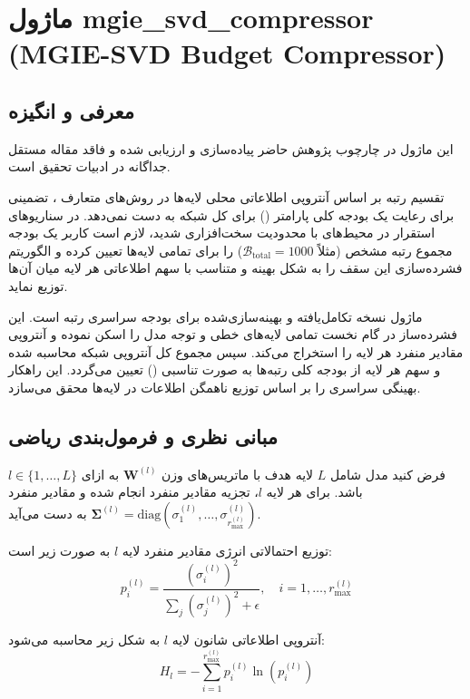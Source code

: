 \section{ماژول mgie\_svd\_compressor (MGIE-SVD Budget Compressor)}
\label{sec:module_mgie_svd_compressor}

\subsection{معرفی و انگیزه}
این ماژول در چارچوب پژوهش حاضر پیاده‌سازی و ارزیابی شده و فاقد مقاله مستقل جداگانه در ادبیات تحقیق است.

تقسیم رتبه بر اساس آنتروپی اطلاعاتی محلی لایه‌ها در روش‌های متعارف ، تضمینی برای رعایت یک بودجه کلی پارامتر () برای کل شبکه به دست نمی‌دهد. در سناریوهای استقرار در محیط‌های با محدودیت سخت‌افزاری شدید، لازم است کاربر یک بودجه مجموع رتبه مشخص (مثلاً $\mathcal{B}_{\text{total}} = 1000$) را برای تمامی لایه‌ها تعیین کرده و الگوریتم فشرده‌سازی این سقف را به شکل بهینه و متناسب با سهم اطلاعاتی هر لایه میان آن‌ها توزیع نماید.

ماژول  نسخه تکامل‌یافته و بهینه‌سازی‌شده برای بودجه سراسری رتبه است. این فشرده‌ساز در گام نخست تمامی لایه‌های خطی و توجه مدل را اسکن نموده و آنتروپی مقادیر منفرد هر لایه را استخراج می‌کند. سپس مجموع کل آنتروپی شبکه محاسبه شده و سهم هر لایه از بودجه کلی رتبه‌ها به صورت تناسبی () تعیین می‌گردد. این راهکار بهینگی سراسری را بر اساس توزیع ناهمگن اطلاعات در لایه‌ها محقق می‌سازد.

\subsection{مبانی نظری و فرمول‌بندی ریاضی}
فرض کنید مدل شامل $L$ لایه هدف با ماتریس‌های وزن $\mathbf{W}^{(l)}$ به ازای $l \in \{1, \dots, L\}$ باشد. برای هر لایه $l$، تجزیه مقادیر منفرد انجام شده و مقادیر منفرد $\mathbf{\Sigma}^{(l)} = \text{diag}(\sigma_1^{(l)}, \dots, \sigma_{r_{\text{max}}^{(l)}}^{(l)})$ به دست می‌آید.

توزیع احتمالاتی انرژی مقادیر منفرد لایه $l$ به صورت زیر است:
\begin{equation}
p_i^{(l)} = \frac{(\sigma_i^{(l)})^2}{\sum_{j} (\sigma_j^{(l)})^2 + \epsilon}, \quad i = 1, \dots, r_{\text{max}}^{(l)}
\end{equation}

آنتروپی اطلاعاتی شانون لایه $l$ به شکل زیر محاسبه می‌شود:
\begin{equation}
H_l = - \sum_{i=1}^{r_{\text{max}}^{(l)}} p_i^{(l)} \ln(p_i^{(l)})
\end{equation}

